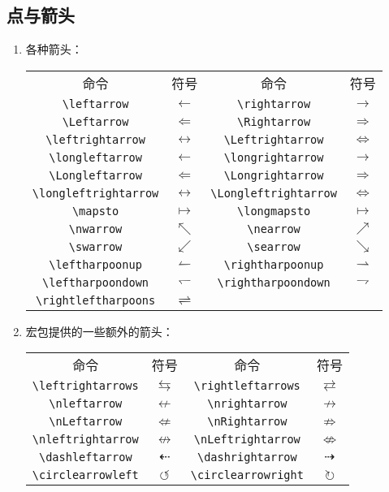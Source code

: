 \subsection{点与箭头}
\begin{multicols}{2}
\begin{enumerate}

\item 各种箭头：

\begin{tabular}{cccc}
命令 & 符号 & 命令 & 符号 \\
\verb|\leftarrow| & $\leftarrow$ & \verb|\rightarrow| & $\rightarrow$ \\ 
\verb|\Leftarrow| & $\Leftarrow$ & \verb|\Rightarrow| & $\Rightarrow$ \\ 
\verb|\leftrightarrow| & $\leftrightarrow$ & \verb|\Leftrightarrow| & $\Leftrightarrow$ \\ 
\verb|\longleftarrow| & $\longleftarrow$ & \verb|\longrightarrow| & $\longrightarrow$ \\ 
\verb|\Longleftarrow| & $\Longleftarrow$ & \verb|\Longrightarrow| & $\Longrightarrow$ \\ 
\verb|\longleftrightarrow| & $\longleftrightarrow$ & \verb|\Longleftrightarrow| & $\Longleftrightarrow$ \\ 
\verb|\mapsto| & $\mapsto$ & \verb|\longmapsto| & $\longmapsto$ \\ 
\verb|\nwarrow| & $\nwarrow$ & \verb|\nearrow| & $\nearrow$ \\ 
\verb|\swarrow| & $\swarrow$ & \verb|\searrow| & $\searrow$ \\ 
\verb|\leftharpoonup| & $\leftharpoonup$ & \verb|\rightharpoonup| & $\rightharpoonup$ \\ 
\verb|\leftharpoondown| & $\leftharpoondown$ & \verb|\rightharpoondown| & $\rightharpoondown$ \\ 
\verb|\rightleftharpoons| & $\rightleftharpoons$ & & \\ 
\end{tabular}

\item {} 宏包提供的一些额外的箭头：

\begin{tabular}{cccc}
命令 & 符号 & 命令 & 符号 \\
\verb|\leftrightarrows| & $\leftrightarrows$ & \verb|\rightleftarrows| & $\rightleftarrows$ \\ 
\verb|\nleftarrow| & $\nleftarrow$ & \verb|\nrightarrow| & $\nrightarrow$ \\ 
\verb|\nLeftarrow| & $\nLeftarrow$ & \verb|\nRightarrow| & $\nRightarrow$ \\ 
\verb|\nleftrightarrow| & $\nleftrightarrow$ & \verb|\nLeftrightarrow| & $\nLeftrightarrow$ \\ 
\verb|\dashleftarrow| & $\dashleftarrow$ & \verb|\dashrightarrow| & $\dashrightarrow$ \\ 
\verb|\circlearrowleft| & $\circlearrowleft$ & \verb|\circlearrowright| & $\circlearrowright$ \\ 
\end{tabular}


\end{enumerate}
\end{multicols}
